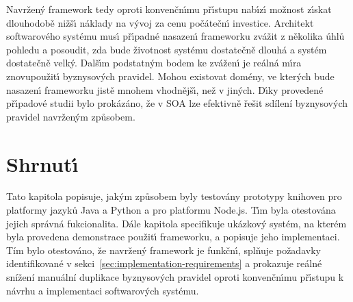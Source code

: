 Navržen\'y framework tedy oproti konvenčn\'{\i}mu př\'{\i}stupu nab\'{\i}z\'{\i} možnost z\'{\i}skat dlouhodobě
nižš\'{\i} náklady na v\'yvoj za cenu počátečn\'{\i} investice. Architekt softwarového systému mus\'{\i} př\'{\i}padné nasazen\'{\i}
frameworku zvážit z několika úhlů pohledu a posoudit, zda bude životnost systému dostatečně dlouhá a systém
dostatečně velk\'y. Dalš\'{\i}m podstatn\'ym bodem ke zvážen\'{\i} je reálná m\'{\i}ra znovupoužit\'{\i} byznysov\'ych pravidel.
Mohou existovat domény, ve kter\'ych bude nasazen\'{\i} frameworku jistě mnohem vhodnějš\'{\i}, než v jin\'ych.
D\'{\i}ky provedené př\'{\i}padové studii bylo prokázáno, že v \gls{SOA} lze efektivně řešit sdílení byznysov\'ych pravidel
navržen\'ym způsobem.

\section{Shrnut\'{\i}}

Tato kapitola popisuje, jak\'ym způsobem byly testovány prototypy knihoven
pro platformy jazyků Java a Python a pro platformu Node.js. T\'{\i}m byla otestována
jejich správná fukcionalita. Dále kapitola specifikuje ukázkový systém, na kterém byla
provedena demonstrace použit\'{\i} frameworku, a popisuje jeho implementaci.
Tím bylo otestováno, že navržen\'y framework je funkčn\'{\i},
splňuje požadavky identifikované v sekci~\ref{sec:implementation-requirements}
a prokazuje reálné snížení manuální duplikace byznysových pravidel oproti
konvenčn\'{\i}mu př\'{\i}stupu k návrhu a implementaci softwarov\'ych systému.

